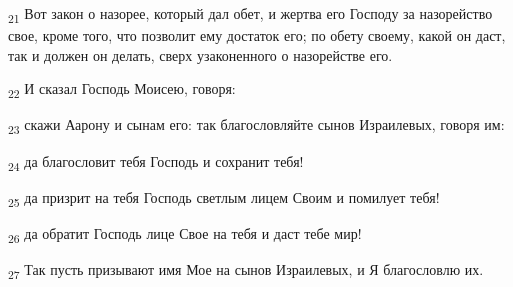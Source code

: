\begin{tcolorbox}
\textsubscript{21} Вот закон о назорее, который дал обет, и жертва его Господу за назорейство свое, кроме того, что позволит ему достаток его; по обету своему, какой он даст, так и должен он делать, сверх узаконенного о назорействе его.
\end{tcolorbox}
\begin{tcolorbox}
\textsubscript{22} И сказал Господь Моисею, говоря:
\end{tcolorbox}
\begin{tcolorbox}
\textsubscript{23} скажи Аарону и сынам его: так благословляйте сынов Израилевых, говоря им:
\end{tcolorbox}
\begin{tcolorbox}
\textsubscript{24} да благословит тебя Господь и сохранит тебя!
\end{tcolorbox}
\begin{tcolorbox}
\textsubscript{25} да призрит на тебя Господь светлым лицем Своим и помилует тебя!
\end{tcolorbox}
\begin{tcolorbox}
\textsubscript{26} да обратит Господь лице Свое на тебя и даст тебе мир!
\end{tcolorbox}
\begin{tcolorbox}
\textsubscript{27} Так пусть призывают имя Мое на сынов Израилевых, и Я благословлю их.
\end{tcolorbox}
